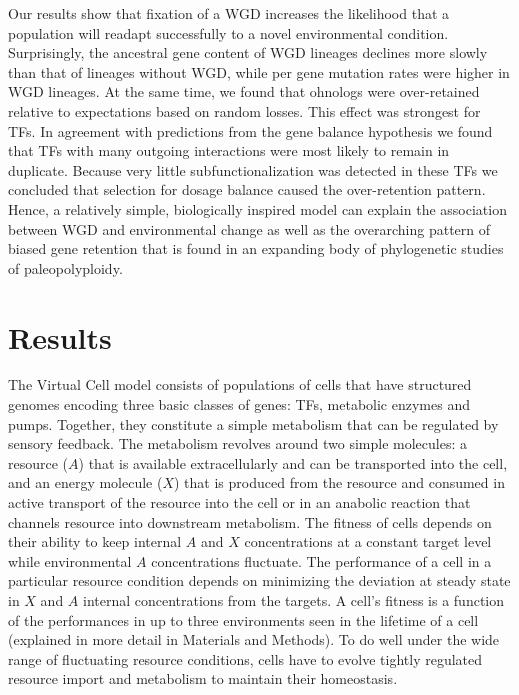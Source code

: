 Our results show that fixation of a WGD increases the likelihood that a population will readapt successfully to a novel environmental condition. Surprisingly, the ancestral gene content of WGD lineages declines more slowly than that of lineages without WGD, while per gene mutation rates were higher in WGD lineages. At the same time, we found that ohnologs were over-retained relative to expectations based on random losses. This effect was strongest for TFs. In agreement with predictions from the gene balance hypothesis we found that TFs with many outgoing interactions were most likely to remain in duplicate. Because very little subfunctionalization was detected in these TFs we concluded that selection for dosage balance caused the over-retention pattern. Hence, a relatively simple, biologically inspired model can explain the association between WGD and environmental change as well as the overarching pattern of biased gene retention that is found in an expanding body of phylogenetic studies of paleopolyploidy.

\section{Results}
The Virtual Cell model consists of populations of cells that have structured genomes encoding three basic classes of genes: TFs, metabolic enzymes and pumps. Together, they constitute a simple metabolism that can be regulated by sensory feedback. The metabolism revolves around two simple molecules: a resource ($A$) that is available extracellularly and can be transported into the cell, and an energy molecule ($X$) that is produced from the resource and consumed in active transport of the resource into the cell or in an anabolic reaction that channels resource into downstream metabolism. The fitness of cells depends on their ability to keep internal $A$ and $X$ concentrations at a constant target level while environmental $A$ concentrations fluctuate. The performance of a cell in a particular resource condition depends on minimizing the deviation at steady state in $X$ and $A$ internal concentrations from the targets. A cell's fitness is a function of the performances in up to three environments seen in the lifetime of a cell (explained in more detail in Materials and Methods). To do well under the wide range of fluctuating resource conditions, cells have to evolve tightly regulated resource import and metabolism to maintain their homeostasis. 

